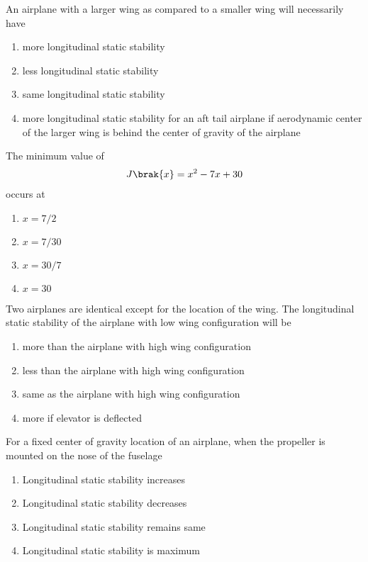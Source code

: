     \item An airplane with a larger wing as compared to a smaller wing will necessarily have 
    \begin{enumerate}
        \item more longitudinal static stability
        \item less longitudinal static stability
        \item same longitudinal static stability
        \item more longitudinal static stability for an aft tail airplane if aerodynamic center of the larger wing is behind the center of gravity of the airplane \\
    \end{enumerate}

    \item The minimum value of 
    \begin{align*}
       J\brak{x} = x^2 -7x +30
    \end{align*}occurs at 
    \begin{enumerate}
        \item $x = 7/2$
        \item $x = 7/30$
        \item $x = 30/7$
        \item $x = 30$ \\
    \end{enumerate}

    \item Two airplanes are identical except for the location of the wing. The longitudinal static stability of the airplane with low wing configuration will be 
    \begin{enumerate}
        \item more than the airplane with high wing configuration
        \item less than the airplane with high wing configuration
        \item same as the airplane with high wing configuration
        \item more if elevator is deflected \\
    \end{enumerate}

    \item For a fixed center of gravity location of an airplane, when the propeller is mounted on the nose of the fuselage
    \begin{enumerate}
        \item Longitudinal static stability increases
        \item Longitudinal static stability decreases
        \item Longitudinal static stability remains same
        \item Longitudinal static stability is maximum \\
    \end{enumerate}

